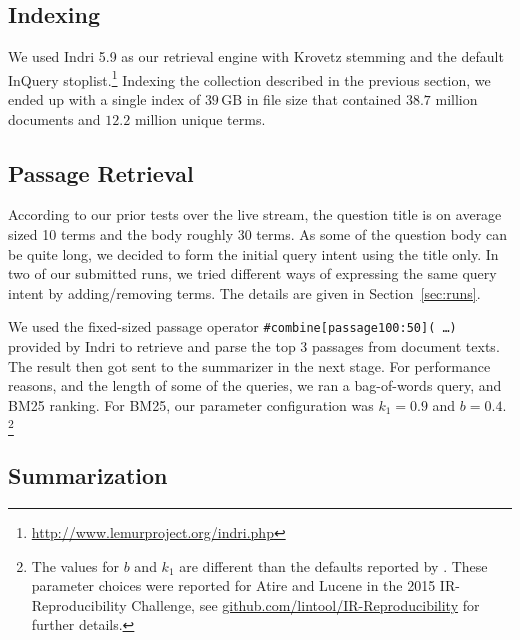 \documentclass[a4paper,10pt,conference,compsocconf,final]{IEEEtran}
\newcommand\gb[1]{$#1$\,GB}
\begin{document}
\subsection{Indexing}
We used Indri 5.9 as
our retrieval engine with Krovetz stemming and the default InQuery
stoplist.\footnote{\url{http://www.lemurproject.org/indri.php}} Indexing the
collection described in the previous section, we ended up with a
single index of \gb{39} in file size that contained $38.7$ million documents
and $12.2$ million unique terms.

\subsection{Passage Retrieval}
\label{sec:passage}

According to our prior tests over the live stream, the question title is on
average sized 10 terms and the body roughly 30 terms.  As some of the question
body can be quite long, we decided to form the initial query intent using
the title only.  In two of our submitted runs, we tried different ways of
expressing the same query intent by adding/removing terms.  The details are
given in Section~\ref{sec:runs}.

We used the fixed-sized passage operator \texttt{\#combine[passage100:50](
\ldots)} provided by Indri to retrieve and parse the top 3 passages from
document texts.  The result then got sent to the summarizer in the next stage.
For performance reasons, and the length of some of the queries, we ran a
bag-of-words query, and BM25 ranking.  For BM25, our parameter configuration
was $k_1=0.9$ and $b=0.4$.  \footnote{The values for $b$ and $k_1$ are
different than the defaults reported by {\citet{rwj+94-trec}}.  These parameter
choices were reported for Atire and Lucene in the 2015 IR-Reproducibility
Challenge, see {\url{github.com/lintool/IR-Reproducibility}} for further
details.}  

\subsection{Summarization}
\label{sec:sum}

\end{document}
